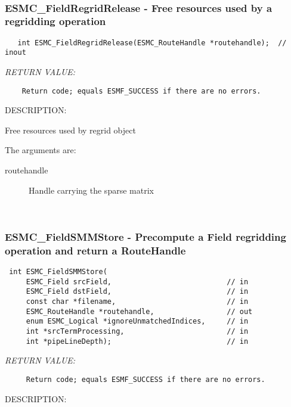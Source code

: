  
\mbox{}\hrulefill\ 
 
\subsubsection [ESMC\_FieldRegridRelease] {ESMC\_FieldRegridRelease - Free resources used by a regridding operation}


  
\begin{verbatim}   int ESMC_FieldRegridRelease(ESMC_RouteHandle *routehandle);  // inout
 \end{verbatim}{\em RETURN VALUE:}
\begin{verbatim}    Return code; equals ESMF_SUCCESS if there are no errors.\end{verbatim}
{\sf DESCRIPTION:\\ }


  
    Free resources used by regrid object
  
    The arguments are:
    \begin{description}
    \item[routehandle]
      Handle carrying the sparse matrix
    \end{description}
   
 
\mbox{}\hrulefill\ 
 
\subsubsection [ESMC\_FieldSMMStore] {ESMC\_FieldSMMStore - Precompute a Field regridding operation and return a RouteHandle}


  
\begin{verbatim} int ESMC_FieldSMMStore(
     ESMC_Field srcField,                           // in
     ESMC_Field dstField,                           // in
     const char *filename,                          // in
     ESMC_RouteHandle *routehandle,                 // out
     enum ESMC_Logical *ignoreUnmatchedIndices,     // in
     int *srcTermProcessing,                        // in
     int *pipeLineDepth);                           // in
 \end{verbatim}{\em RETURN VALUE:}
\begin{verbatim}     Return code; equals ESMF_SUCCESS if there are no errors.\end{verbatim}
{\sf DESCRIPTION:\\ }


